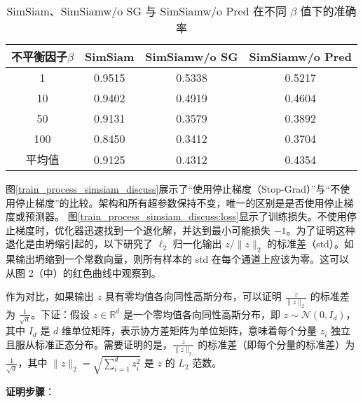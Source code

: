 \documentclass[master]{thesis-uestc}
\begin{document}
\begin{table}
    \caption{SimSiam、SimSiamw/o SG 与 SimSiamw/o Pred 在不同 $\beta$ 值下的准确率}
    \centering
    \begin{tabular}{cccc}
    \toprule
    不平衡因子$\beta$  & SimSiam & SimSiamw/o SG & SimSiamw/o Pred \\
    \midrule
    1   & 0.9515  & 0.5338  & 0.5217 \\
    10  & 0.9402  & 0.4919  & 0.4604 \\
    50  & 0.9131  & 0.3579  & 0.3892 \\
    100 & 0.8450  & 0.3412  & 0.3704 \\
    \midrule
    平均值 & 0.9125 & 0.4312 & 0.4354\\
    \bottomrule
    \end{tabular}
    \label{simsiam_vs_simsiamwosg_wopred}
\end{table}

图\ref{train_process_simsiam_discuss}展示了“使用停止梯度（Stop-Grad）”与“不使用停止梯度”的比较。架构和所有超参数保持不变，唯一的区别是是否使用停止梯度或预测器。
图\ref{train_process_simsiam_discuss:loss}显示了训练损失。不使用停止梯度时，优化器迅速找到一个退化解，并达到最小可能损失 \(-1\)。为了证明这种退化是由坍缩引起的，以下研究了 \(\ell_2\) 归一化输出 \( z / \|z\|_2 \) 的标准差（std）。如果输出坍缩到一个常数向量，则所有样本的 std 在每个通道上应该为零。这可以从图 2（中）的红色曲线中观察到。


作为对比，如果输出 \( z \) 具有零均值各向同性高斯分布，可以证明 \( \frac{z}{\|z\|_2} \) 的标准差为 \( \frac{1}{\sqrt{d}} \)。下证：假设 \( z \in \mathbb{R}^d \) 是一个零均值各向同性高斯分布，即 \( z \sim \mathcal{N}(0, I_d) \)，其中 \( I_d \) 是 \( d \) 维单位矩阵，表示协方差矩阵为单位矩阵，意味着每个分量 \( z_i \) 独立且服从标准正态分布。需要证明的是，\( \frac{z}{\|z\|_2} \) 的标准差（即每个分量的标准差）为 \( \frac{1}{\sqrt{d}} \)，其中 \( \|z\|_2 = \sqrt{\sum_{i=1}^{d} z_i^2} \) 是 \( z \) 的 \( L_2 \) 范数。

\textbf{证明步骤}：
\end{document}
